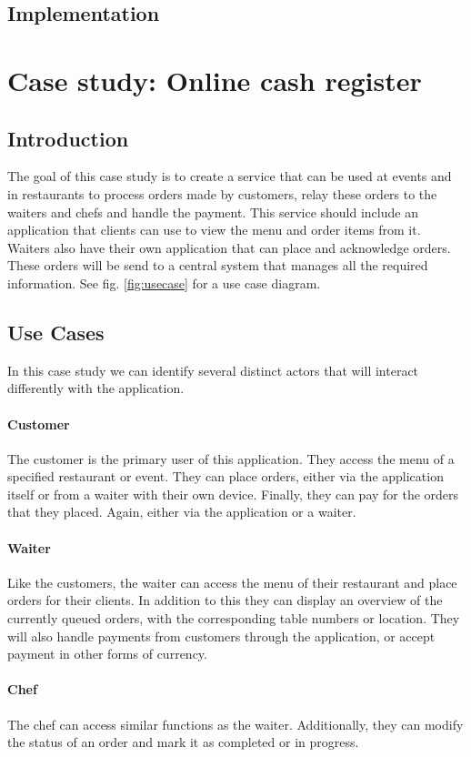 \documentclass[12pt]{article}
\begin{document}
\subsection{Implementation}\label{sec:implementation}





\section{Case study: Online cash register}
\subsection{Introduction}
The goal of this case study is to create a service that can be used at events and in restaurants to process orders made by customers, relay these orders to the waiters and chefs and handle the payment. This service should include an application that clients can use to view the menu and order items from it. Waiters also have their own application that can place and acknowledge orders. These orders will be send to a central system that manages all the required information. See fig. \ref{fig:usecase} for a use case diagram.
\subsection{Use Cases}
In this case study we can identify several distinct actors that will interact differently with the application.
\paragraph{Customer}
The customer is the primary user of this application. They access the menu of a specified restaurant or event. They can place orders, either via the application itself or from a waiter with their own device. Finally, they can pay for the orders that they placed. Again, either via the application or a waiter.
\paragraph{Waiter}
Like the customers, the waiter can access the menu of their restaurant and place orders for their clients. In addition to this they can display an overview of the currently queued orders, with the corresponding table numbers or location. They will also handle payments from customers through the application, or accept payment in other forms of currency.
\paragraph{Chef}
The chef can access similar functions as the waiter. Additionally, they can modify the status of an order and mark it as completed or in progress.
\end{document}
